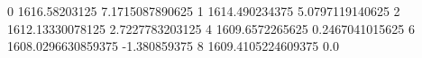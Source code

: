 0 1616.58203125 7.1715087890625
1 1614.490234375 5.0797119140625
2 1612.13330078125 2.7227783203125
4 1609.6572265625 0.2467041015625
6 1608.0296630859375 -1.380859375
8 1609.4105224609375 0.0
